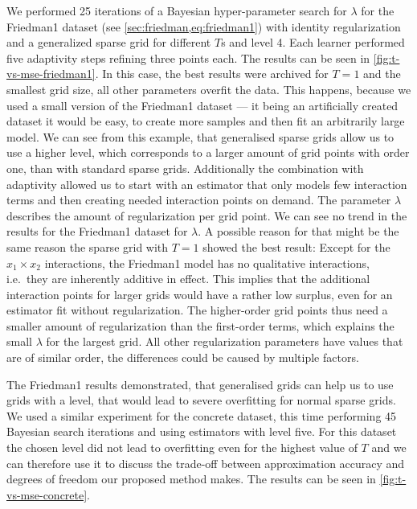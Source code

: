 We performed 25 iterations of a Bayesian hyper-parameter search for \(\lambda\) for the Friedman1 dataset (see \cref{sec:friedman,eq:friedman1}) with identity regularization and a generalized sparse grid for different \(T\)s and level 4.
Each learner performed five adaptivity steps refining three points each.
The results can be seen in \cref{fig:t-vs-mse-friedman1}.
In this case, the best results were archived for \(T = 1\) and the smallest grid
size, all other parameters overfit the data.
This happens, because we used a small version of the Friedman1 dataset --- it
being an artificially created dataset it would be easy, to create more samples
and then fit an arbitrarily large model.
We can see from this example, that generalised sparse grids allow us to use a
higher level, which corresponds to a larger amount of grid points with order
one, than with standard sparse grids.
Additionally the combination with adaptivity allowed us to start with an
estimator that only models few interaction terms and then creating needed
interaction points on demand.
The parameter \(\lambda\) describes the amount of regularization per
grid point.
We can see no trend in the results for the Friedman1 dataset for \(\lambda\).
A possible reason for that might be the same reason the sparse grid with \(T =
1\) showed the best result:
Except for the \(x_1 \times x_2\) interactions, the Friedman1 model has no
qualitative interactions, i.e.~they are inherently additive in effect.
This implies that the additional interaction points for larger grids would
have a rather low surplus, even for an estimator fit without regularization.
The higher-order grid points thus need a smaller amount of regularization than
the first-order terms, which explains the small \(\lambda\) for the largest
grid.
All other regularization parameters have values that are of similar order, the
differences could be caused by multiple factors.

The Friedman1 results demonstrated, that generalised grids can help us to use
grids with a level, that would lead to severe overfitting for normal sparse
grids.
We used a similar experiment for the concrete dataset, this time performing 45
Bayesian search iterations and using estimators with level five.
For this dataset the chosen level did not lead to overfitting even for the
highest value of \(T\) and we can therefore use it to discuss the trade-off
between approximation accuracy and degrees of freedom our proposed method makes.
The results can be seen in \cref{fig:t-vs-mse-concrete}.


